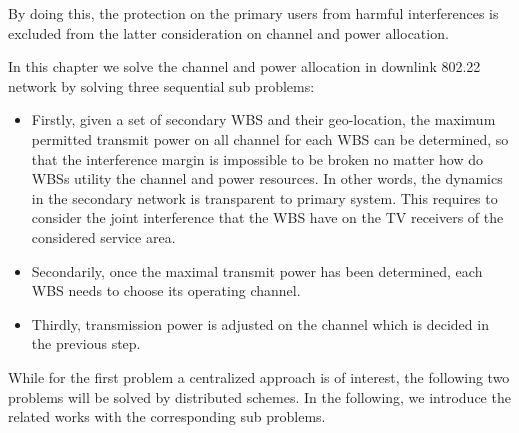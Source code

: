 By doing this, the protection on the primary users from harmful interferences is excluded from the latter consideration on channel and power allocation.


In this chapter we solve the channel and power allocation in downlink 802.22 network by solving three sequential sub problems:
\begin{itemize}
\item  Firstly, given a set of secondary WBS and their geo-location, the maximum permitted transmit power on all channel for each WBS can be determined, so that the interference margin is impossible to be broken no matter how do WBSs utility the channel and power resources. 
In other words, the dynamics in the secondary network is transparent to primary system. 
This requires to consider the joint interference that the WBS have on the TV receivers of the considered service area. 
\item Secondarily, once the maximal transmit power has been determined, each WBS needs to choose its operating channel. 
\item Thirdly, transmission power is adjusted on the channel which is decided in the previous step.
\end{itemize}
While for the first problem a centralized approach is of interest, the following two problems will be solved by distributed schemes.
In the following, we introduce the related works with the corresponding sub problems.





